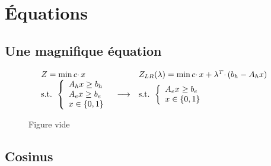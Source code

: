 

\chapter{Équations}

\section{Une magnifique équation}

$$
  \begin{array}{l c l}
    Z = \min c\cdotp x &                 & Z_{LR}(\lambda) = \min c\cdotp x + \lambda^T\cdotp(b_h - A_hx) \\
    \mbox{s.t. }
    \left\{
    \begin{array}{l}
      A_hx \geq b_h \\
      A_ex \geq b_e \\
      x \in \{0, 1\}
    \end{array}
    \right.
                       & \longrightarrow
                       & \mbox{s.t. }
    \left\{
    \begin{array}{l}
      A_ex \geq b_e \\
      x \in \{0, 1\}
    \end{array}
    \right.
  \end{array}
$$


\begin{figure}
  \caption{Figure vide}
\end{figure}


\section{Cosinus}

\def\b#1{\textcolor{bleu}{#1}}
\def\v#1{\textcolor{violet}{#1}}
\def\r#1{\textcolor{pink}{#1}}
\def\o#1{\textcolor{orange}{#1}}
\def\g#1{\textcolor{vert}{#1}}

